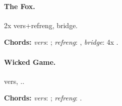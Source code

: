 \documentclass[%
twoside,                 %
draft,                   %
final,                   %
10pt]{article}
\begin{document}
\paragraph{The Fox.}
2x vers+refreng, bridge.

\textbf{Chords:} \emph{vers}: ; \emph{refreng}: , \emph{bridge}: 4x
.




\paragraph{Wicked Game.}
vers, ..

\textbf{Chords:} \emph{vers}: ; \emph{refreng}: .









\printindex
\end{document}
